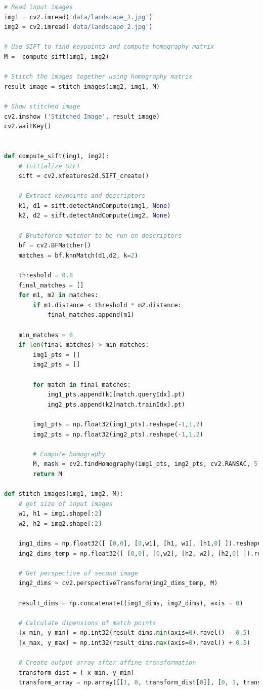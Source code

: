 \documentclass{csc_assignment4}
\begin{document}
\begin{description}
\begin{enumerate}[label=(\alph*)]
\begin{lstlisting}[language=Python]
# Read input images
img1 = cv2.imread('data/landscape_1.jpg')
img2 = cv2.imread('data/landscape_2.jpg')

# Use SIFT to find keypoints and compute homography matrix
M =  compute_sift(img1, img2)

# Stitch the images together using homography matrix
result_image = stitch_images(img2, img1, M)

# Show stitched image
cv2.imshow ('Stitched Image', result_image)
cv2.waitKey()


def compute_sift(img1, img2):
	# Initialize SIFT 
	sift = cv2.xfeatures2d.SIFT_create()

	# Extract keypoints and descriptors
	k1, d1 = sift.detectAndCompute(img1, None)
	k2, d2 = sift.detectAndCompute(img2, None)

	# Bruteforce matcher to be run on descriptors
	bf = cv2.BFMatcher()
	matches = bf.knnMatch(d1,d2, k=2)

	threshold = 0.8
	final_matches = []
	for m1, m2 in matches:
		if m1.distance < threshold * m2.distance:
			final_matches.append(m1)

	min_matches = 8
	if len(final_matches) > min_matches:
		img1_pts = []
		img2_pts = []

		for match in final_matches:
			img1_pts.append(k1[match.queryIdx].pt)
			img2_pts.append(k2[match.trainIdx].pt)

		img1_pts = np.float32(img1_pts).reshape(-1,1,2)
		img2_pts = np.float32(img2_pts).reshape(-1,1,2)
		
		# Compute homography
		M, mask = cv2.findHomography(img1_pts, img2_pts, cv2.RANSAC, 5.0)
		return M

def stitch_images(img1, img2, M):
	# get size of input images
	w1, h1 = img1.shape[:2]
	w2, h2 = img2.shape[:2]

	img1_dims = np.float32([ [0,0], [0,w1], [h1, w1], [h1,0] ]).reshape(-1,1,2)
	img2_dims_temp = np.float32([ [0,0], [0,w2], [h2, w2], [h2,0] ]).reshape(-1,1,2)

	# Get perspective of second image
	img2_dims = cv2.perspectiveTransform(img2_dims_temp, M)

	result_dims = np.concatenate((img1_dims, img2_dims), axis = 0)

	# Calculate dimensions of match points
	[x_min, y_min] = np.int32(result_dims.min(axis=0).ravel() - 0.5)
	[x_max, y_max] = np.int32(result_dims.max(axis=0).ravel() + 0.5)
	
	# Create output array after affine transformation 
	transform_dist = [-x_min,-y_min]
	transform_array = np.array([[1, 0, transform_dist[0]], [0, 1, transform_dist[1]], [0,0,1]]) 


\end{lstlisting}
\end{enumerate}
\end{description}
\end{document}
